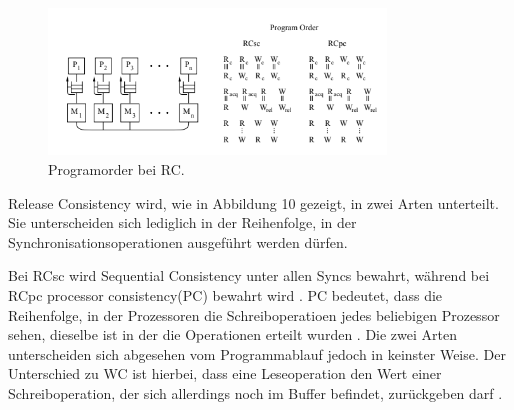 \documentclass[final,bibliography=totocnumbered]{include/sikseminar}
\begin{document}
\begin{figure}[htbp] %
  \centering
  \includegraphics[width=0.8\textwidth]{figures/rc}
  \caption{Programorder bei RC\cite{mcm3}.}
  \label{Fig:rc}
\end{figure}

Release Consistency wird, wie in Abbildung 10 gezeigt, %
in zwei Arten unterteilt. Sie unterscheiden sich lediglich in der Reihenfolge, in der Synchronisationsoperationen ausgeführt werden dürfen.

Bei RCsc wird Sequential Consistency unter allen Syncs bewahrt, während bei RCpc processor consistency(PC) bewahrt wird \cite{mcm3}.
PC bedeutet, dass die Reihenfolge, in der Prozessoren die Schreiboperatioen jedes beliebigen Prozessor sehen, dieselbe ist in der die Operationen erteilt wurden \cite{smcmtutorial}.
Die zwei Arten unterscheiden sich abgesehen vom Programmablauf jedoch in keinster Weise. 
Der Unterschied zu WC ist hierbei, dass eine Leseoperation den Wert einer Schreiboperation, der sich allerdings noch im Buffer befindet, zurückgeben darf \cite{smcmtutorial}.
\end{document}
